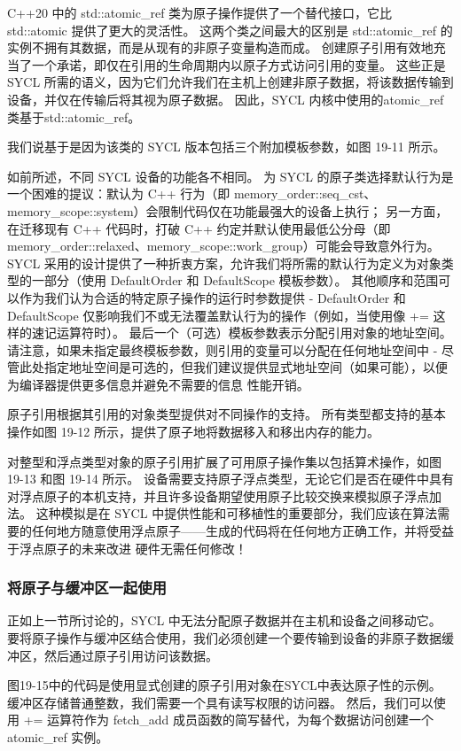 C++20 中的 std::atomic\_ref 类为原子操作提供了一个替代接口，它比 std::atomic 提供了更大的灵活性。 这两个类之间最大的区别是 std::atomic\_ref 的实例不拥有其数据，而是从现有的非原子变量构造而成。 创建原子引用有效地充当了一个承诺，即仅在引用的生命周期内以原子方式访问引用的变量。 这些正是 SYCL 所需的语义，因为它们允许我们在主机上创建非原子数据，将该数据传输到设备，并仅在传输后将其视为原子数据。 因此，SYCL 内核中使用的atomic\_ref 类基于std::atomic\_ref。

我们说基于是因为该类的 SYCL 版本包括三个附加模板参数，如图 19-11 所示。

如前所述，不同 SYCL 设备的功能各不相同。 为 SYCL 的原子类选择默认行为是一个困难的提议：默认为 C++ 行为（即 memory\_order::seq\_cst、memory\_scope::system）会限制代码仅在功能最强大的设备上执行； 另一方面，在迁移现有 C++ 代码时，打破 C++ 约定并默认使用最低公分母（即 memory\_order::relaxed、memory\_scope::work\_group）可能会导致意外行为。 SYCL 采用的设计提供了一种折衷方案，允许我们将所需的默认行为定义为对象类型的一部分（使用 DefaultOrder 和 DefaultScope 模板参数）。 其他顺序和范围可以作为我们认为合适的特定原子操作的运行时参数提供 - DefaultOrder 和 DefaultScope 仅影响我们不或无法覆盖默认行为的操作（例如，当使用像 += 这样的速记运算符时）。 最后一个（可选）模板参数表示分配引用对象的地址空间。 请注意，如果未指定最终模板参数，则引用的变量可以分配在任何地址空间中 - 尽管此处指定地址空间是可选的，但我们建议提供显式地址空间（如果可能），以便为编译器提供更多信息并避免不需要的信息 性能开销。

原子引用根据其引用的对象类型提供对不同操作的支持。 所有类型都支持的基本操作如图 19-12 所示，提供了原子地将数据移入和移出内存的能力。

对整型和浮点类型对象的原子引用扩展了可用原子操作集以包括算术操作，如图 19-13 和图 19-14 所示。 设备需要支持原子浮点类型，无论它们是否在硬件中具有对浮点原子的本机支持，并且许多设备期望使用原子比较交换来模拟原子浮点加法。 这种模拟是在 SYCL 中提供性能和可移植性的重要部分，我们应该在算法需要的任何地方随意使用浮点原子——生成的代码将在任何地方正确工作，并将受益于浮点原子的未来改进 硬件无需任何修改！

\subsubsection{将原子与缓冲区一起使用}
正如上一节所讨论的，SYCL 中无法分配原子数据并在主机和设备之间移动它。 要将原子操作与缓冲区结合使用，我们必须创建一个要传输到设备的非原子数据缓冲区，然后通过原子引用访问该数据。

图19-15中的代码是使用显式创建的原子引用对象在SYCL中表达原子性的示例。 缓冲区存储普通整数，我们需要一个具有读写权限的访问器。 然后，我们可以使用 += 运算符作为 fetch\_add 成员函数的简写替代，为每个数据访问创建一个atomic\_ref 实例。

